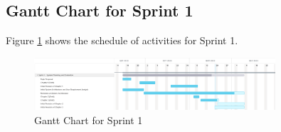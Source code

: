 \subsection{Gantt Chart for Sprint 1}
\label{subsec:gantt_chart_sprint1}
Figure \ref{fig:gantt_chart_sprint1} shows the schedule of activities for Sprint 1.
\begin{figure}[ht]
    \centering
    \includegraphics[width=0.80\textwidth]{./assets/Chapter_3/Gantt/Gantt_Chart_Sprint1.png}
    \caption{Gantt Chart for Sprint 1}
    \label{fig:gantt_chart_sprint1}
\end{figure}
\FloatBarrier

